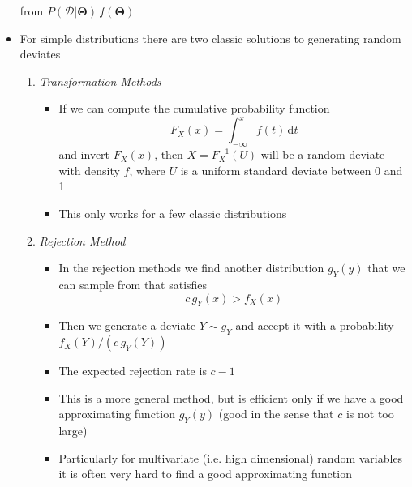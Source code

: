 \documentclass[11pt]{article}
\newcommand{\dd}{\mathrm{d}}
\begin{document}
\begin{itemize}
from \(P(\mathcal{D}|\bm{\Theta})\,f(\bm{\Theta})\)
\item For simple distributions there are two classic solutions to
generating random deviates
\begin{enumerate}
\item \emph{Transformation Methods}
\begin{itemize}
\item If we can compute the cumulative probability function
$$ F_{X}(x) = \int_{-\infty}^{x} f(t)\,\dd t $$
and invert \(F_{X}(x)\), then \(X=F^{-1}_{X}(U)\) will be a
random deviate with density \(f\), where \(U\)
is a uniform standard deviate between 0 and 1
\item This only works for a few classic distributions
\end{itemize}
\item \emph{Rejection Method}
\begin{itemize}
\item In the rejection methods we find another distribution
\(g_{Y}(y)\) that we can sample from that satisfies
$$ c\, g_{Y}(x) > f_{X}(x) $$
\item Then we generate a deviate \(Y\sim g_{Y}\) and accept it with
a probability \(f_{X}(Y)/(c\,g_{Y}(Y))\)
\item The expected rejection rate is \(c-1\)
\item This is a more general method, but is efficient only if we
have a good approximating function \(g_{Y}(y)\) (good in the
sense that \(c\) is not too large)
\item Particularly for multivariate (i.e. high dimensional) random
variables it is often very hard to find a good approximating
function
\end{itemize}
\end{enumerate}
\end{itemize}
\end{document}
